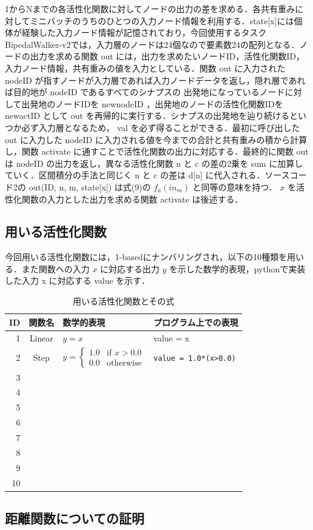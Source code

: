 1からNまでの各活性化関数に対してノードの出力の差を求める．各共有重みに対してミニバッチのうちのひとつの入力ノード情報を利用する．state[x]には個体が経験した入力ノード情報が記憶されており，今回使用するタスクBipedalWalker-v2\cite{OpenAI}では，入力層のノードは24個なので要素数24の配列となる．ノードの出力を求める関数 out には，出力を求めたいノードID，活性化関数ID，入力ノード情報，共有重みの値を入力としている．関数 out に入力された nodeID が指すノードが入力層であれば入力ノードデータを返し，隠れ層であれば目的地が nodeID であるすべてのシナプスの 出発地になっているノードに対して出発地のノードIDを newnodeID ，出発地のノードの活性化関数IDを newactID として out を再帰的に実行する．シナプスの出発地を辿り続けるといつか必ず入力層となるため， val を必ず得ることができる．最初に呼び出した out に入力した nodeID に入力される値を今までの合計と共有重みの積から計算し，関数 activate に通すことで活性化関数の出力に対応する．最終的に関数 out は nodeID の出力を返し，異なる活性化関数 n と c の差の2乗を sum に加算していく．区間積分の手法と同じく n と c の差は d[n] に代入される．ソースコード2の out(ID, n, m, state[x]) は式(9)の $ f_{a}(in_{m}) $ と同等の意味を持つ． $ x $ を活性化関数の入力とした出力を求める関数 activate は後述する．

\subsection{用いる活性化関数}
今回用いる活性化関数には，1-basedにナンバリングされ，以下の10種類を用いる．また関数への入力 $ x $ に対応する出力 $ y $ を示した数学的表現，pythonで実装した入力 x に対応する value を示す．

\begin{table}[H]
    \caption{用いる活性化関数とその式}
    \centering
    \begin{tabular}{rcll}
        \hline
        ID & 関数名 & 数学的表現 & プログラム上での表現 \\
        \hline \hline
        1 & Linear & $ y = x $ & value = x \\
        2 & Step & $ y = \begin{cases}
            1.0 & \text{{if }} x > 0.0 \\
            0.0 & \text{{otherwise}}
            \end{cases}$ & \texttt{value = 1.0*(x>0.0)} \\
        3 &  &  &  \\
        4 &  &  &  \\
        5 &  &  &  \\
        6 &  &  &  \\
        7 &  &  &  \\
        8 &  &  &  \\
        9 &  &  &  \\
        10 &  &  &  \\
        \hline
    \end{tabular}
\end{table}



\subsection{距離関数についての証明}